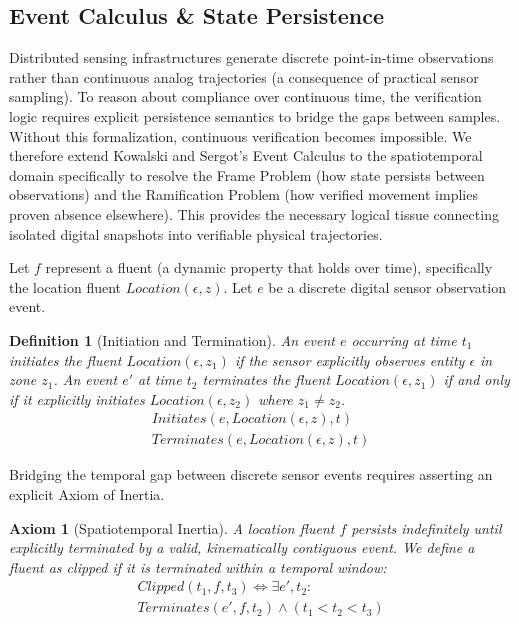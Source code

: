 \documentclass[conference]{IEEEtran}
\newtheorem{definition}{Definition}
\newtheorem{axiom}{Axiom}
\begin{document}
\subsection{Event Calculus \& State Persistence}

Distributed sensing infrastructures generate discrete point-in-time observations rather than continuous analog trajectories (a consequence of practical sensor sampling). To reason about compliance over continuous time, the verification logic requires explicit persistence semantics to bridge the gaps between samples. Without this formalization, continuous verification becomes impossible. We therefore extend Kowalski and Sergot's Event Calculus \cite{b2, b19} to the spatiotemporal domain specifically to resolve the Frame Problem (how state persists between observations) and the Ramification Problem (how verified movement implies proven absence elsewhere). This provides the necessary logical tissue connecting isolated digital snapshots into verifiable physical trajectories.

Let $f$ represent a fluent (a dynamic property that holds over time), specifically the location fluent $Location(\epsilon, z)$. Let $e$ be a discrete digital sensor observation event.

\begin{definition}[Initiation and Termination]
An event $e$ occurring at time $t_1$ initiates the fluent $Location(\epsilon, z_1)$ if the sensor explicitly observes entity $\epsilon$ in zone $z_1$. An event $e'$ at time $t_2$ terminates the fluent $Location(\epsilon, z_1)$ if and only if it explicitly initiates $Location(\epsilon, z_2)$ where $z_1 \neq z_2$.
\begin{align}
Initiates(e, Location(\epsilon, z), t) \\
Terminates(e, Location(\epsilon, z), t) 
\end{align}
\end{definition}

Bridging the temporal gap between discrete sensor events requires asserting an explicit Axiom of Inertia.

\begin{axiom}[Spatiotemporal Inertia]
A location fluent $f$ persists indefinitely until explicitly terminated by a valid, kinematically contiguous event. We define a fluent as clipped if it is terminated within a temporal window:
\begin{align}
Clipped(t_1, f, t_3) \iff \exists e', t_2 : \nonumber \\
Terminates(e', f, t_2) \land (t_1 < t_2 < t_3)
\end{align}
\end{axiom}
\end{document}
